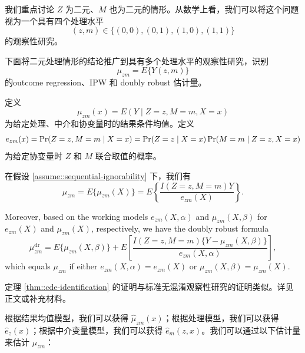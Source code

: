 我们重点讨论 $Z$ 为二元、$M$ 也为二元的情形。从数学上看，我们可以将这个问题视为一个具有四个处理水平
\begin{equation}
(z,m)\in\{(0,0),(0,1),(1,0),(1,1)\}
\end{equation}
的观察性研究。

下面将二元处理情形的结论推广到具有多个处理水平的观察性研究，识别
\begin{equation}
\mu_{zm}=E\{Y(z,m)\}
\end{equation}
的outcome regression、IPW 和 doubly robust 估计量。

定义
\begin{equation}
\label{eq::conditional-outcome-mean}
\mu_{zm}(x) = E(Y\mid Z=z, M=m, X=x)
\end{equation}
为给定处理、中介和协变量时的结果条件均值。定义
\begin{equation}
\label{eq::generalized-propensity}
e_{zm}(x) = \operatorname{Pr}(Z=z, M=m\mid X=x)
= \operatorname{Pr}(Z=z\mid X=x)\operatorname{Pr}(M=m\mid Z=z, X=x)
\end{equation}
为给定协变量时 $Z$ 和 $M$ 联合取值的概率。

\begin{Theorem}[受控直接效应的识别]
\label{thm::cde-identification}
在假设 \ref{assume::sequential-ignorability} 下，我们有
\begin{equation}
\label{eq::cde-identification-reg}
\mu_{zm} = E\{\mu_{zm}(X)\} = E\left\{\frac{I(Z=z, M=m)Y}{e_{zm}(X)}\right\}.
\end{equation}

Moreover, based on the working models $e_{zm}(X,\alpha)$ and $\mu_{zm}(X,\beta)$ for $e_{zm}(X)$ and $\mu_{zm}(X)$, respectively, we have the doubly robust formula
\begin{equation}
\label{eq::cde-identification-dr}
\mu_{zm}^{\mathrm{dr}} = E\{\mu_{zm}(X,\beta)\} + E\left[\frac{I(Z=z, M=m)\{Y - \mu_{zm}(X,\beta)\}}{e_{zm}(X,\alpha)}\right],
\end{equation}
which equals $\mu_{zm}$ if either $e_{zm}(X,\alpha) = e_{zm}(X)$ or $\mu_{zm}(X,\beta) = \mu_{zm}(X)$.
\end{Theorem}

\begin{Proof}
定理 \ref{thm::cde-identification} 的证明与标准无混淆观察性研究的证明类似。详见正文或补充材料。
\end{Proof}

根据结果均值模型，我们可以获得 $\hat{\mu}_{zm}(x)$；根据处理模型，我们可以获得 $\hat{e}_z(x)$；根据中介变量模型，我们可以获得 $\hat{e}_m(z,x)$。我们可以通过以下估计量来估计 $\mu_{zm}$：

